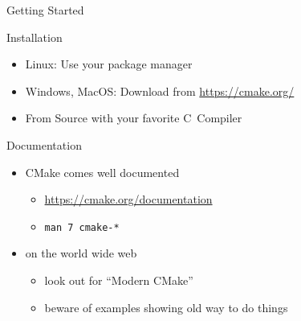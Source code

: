 \documentclass[t]{beamer}
\def\CPP{{C\nolinebreak[4]\hspace{-.05em}\raisebox{.4ex}{\tiny\bf ++}}}
\begin{document}
\begin{frame}{Getting Started}
    \begin{block}{Installation}
        \begin{itemize}
            \item Linux: Use your package manager
            \item Windows, MacOS: Download from \url{https://cmake.org/}
            \item From Source with your favorite \CPP\ Compiler
        \end{itemize}
    \end{block}
    \pause
    \begin{block}{Documentation}
        \begin{itemize}
            \item CMake comes well documented
                \begin{itemize}
                    \item \url{https://cmake.org/documentation}
                    \item \texttt{man 7 cmake-*}
                \end{itemize}
            \item on the world wide web
                \begin{itemize}
                    \item look out for \enquote{Modern CMake}
                    \item beware of examples showing old way to do things
                \end{itemize}
        \end{itemize}
    \end{block}
\end{frame}
\end{document}

